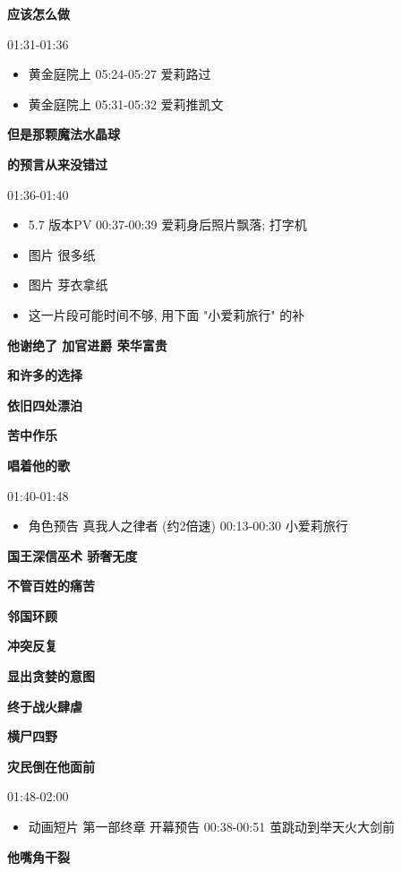 \documentclass[a4paper]{article}
\begin{document}
\textbf{应该怎么做}

01:31-01:36

\begin{itemize}
    \item 黄金庭院上 05:24-05:27 爱莉路过
    \item 黄金庭院上 05:31-05:32 爱莉推凯文
\end{itemize}

\textbf{但是那颗魔法水晶球}

\textbf{的预言从来没错过}

01:36-01:40

\begin{itemize}
    \item 5.7 版本PV 00:37-00:39 爱莉身后照片飘落; 打字机
    \item 图片 很多纸
    \item 图片 芽衣拿纸
    \item 这一片段可能时间不够, 用下面 "小爱莉旅行" 的补
\end{itemize}

\textbf{他谢绝了 加官进爵 荣华富贵}

\textbf{和许多的选择}

\textbf{依旧四处漂泊}

\textbf{苦中作乐}

\textbf{唱着他的歌}

01:40-01:48

\begin{itemize}
    \item 角色预告 真我人之律者 (约2倍速) 00:13-00:30 小爱莉旅行
\end{itemize}

\textbf{国王深信巫术 骄奢无度}

\textbf{不管百姓的痛苦}

\textbf{邻国环顾}

\textbf{冲突反复}

\textbf{显出贪婪的意图}

\textbf{终于战火肆虐}

\textbf{横尸四野}

\textbf{灾民倒在他面前}

01:48-02:00

\begin{itemize}
    \item 动画短片 第一部终章 开幕预告 00:38-00:51 茧跳动到举天火大剑前
\end{itemize}

\textbf{他嘴角干裂}
\end{document}
